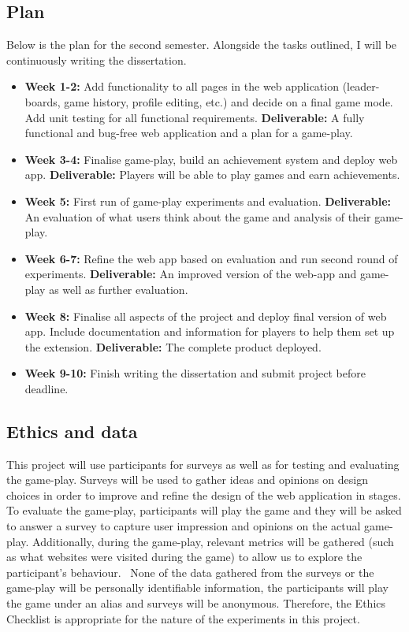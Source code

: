 \documentclass[11pt]{article}
\begin{document}
\subsection{Plan}\label{plan}

Below is the plan for the second semester. Alongside the tasks outlined, I will be continuously writing the dissertation.
\begin{itemize}
\item  \textbf{Week 1-2:} Add functionality to all pages in the web application (leader-boards, game history, profile editing, etc.) and decide on a final game mode. Add unit testing for all functional requirements. \textbf{Deliverable:} A fully functional and bug-free web application and a plan for a game-play.
\item  \textbf{Week 3-4:} Finalise game-play, build an achievement system and deploy web app. \textbf{Deliverable:} Players will be able to play games and earn achievements.
\item  \textbf{Week 5:} First run of game-play experiments and evaluation. \textbf{Deliverable:} An evaluation of what users think about the game and analysis of their game-play. 
\item  \textbf{Week 6-7:} Refine the web app based on evaluation and run second round of experiments. \textbf{Deliverable:} An improved version of the web-app and game-play as well as further evaluation.
\item  \textbf{Week 8:} Finalise all aspects of the project and deploy final version of web app. Include documentation and information for players to help them set up the extension. \textbf{Deliverable:} The complete product deployed.
\item  \textbf{Week 9-10:} Finish writing the dissertation and submit project before deadline.
\end{itemize}

    
\subsection{Ethics and data}\label{ethics}
This project will use participants for surveys as well as for testing and evaluating the game-play. Surveys will be used to gather ideas and opinions on design choices in order to improve and refine the design of the web application in stages. To evaluate the game-play, participants will play the game and they will be asked to answer a survey to capture user impression and opinions on the actual game-play. Additionally, during the game-play, relevant metrics will be gathered (such as what websites were visited during the game) to allow us to explore the participant's behaviour. \
None of the data gathered from the surveys or the game-play will be personally identifiable information, the participants will play the game under an alias and surveys will be anonymous. Therefore, the Ethics Checklist is appropriate for the nature of the experiments in this project.
\end{document}
